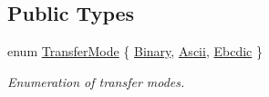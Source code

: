 \subsection*{Public Types}
\begin{DoxyCompactItemize}
\item 
enum \hyperlink{classsf_1_1_ftp_a1cd6b89ad23253f6d97e6d4ca4d558cb}{Transfer\+Mode} \{ \hyperlink{classsf_1_1_ftp_a1cd6b89ad23253f6d97e6d4ca4d558cba6f253b362639fb5e059dc292762a21ee}{Binary}, 
\hyperlink{classsf_1_1_ftp_a1cd6b89ad23253f6d97e6d4ca4d558cbac9e544a22dce8ef3177449cb235d15c2}{Ascii}, 
\hyperlink{classsf_1_1_ftp_a1cd6b89ad23253f6d97e6d4ca4d558cbabb1e34435231e73c96534c71090be7f4}{Ebcdic}
 \}\begin{DoxyCompactList}\small\item\em Enumeration of transfer modes. \end{DoxyCompactList}
\end{DoxyCompactItemize}
